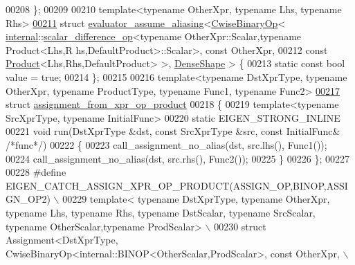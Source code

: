 \begin{DoxyCode}
00208 \};
00209 
00210 \textcolor{keyword}{template}<\textcolor{keyword}{typename} OtherXpr, \textcolor{keyword}{typename} Lhs, \textcolor{keyword}{typename} Rhs>
\hyperlink{struct_eigen_1_1internal_1_1evaluator__assume__aliasing_3_01_cwise_binary_op_3_01internal_1_1sca69efad99c33943cb3731d094798b855b}{00211} \textcolor{keyword}{struct }\hyperlink{struct_eigen_1_1internal_1_1evaluator__assume__aliasing}{evaluator\_assume\_aliasing}<\hyperlink{group___core___module_class_eigen_1_1_cwise_binary_op}{CwiseBinaryOp}<
      \hyperlink{namespaceinternal}{internal}::\hyperlink{struct_eigen_1_1internal_1_1scalar__difference__op}{scalar\_difference\_op}<typename OtherXpr::Scalar,typename Product<Lhs,R
      hs,DefaultProduct>::Scalar>, const OtherXpr,
00212                                                const \hyperlink{group___core___module_class_eigen_1_1_product}{Product}<Lhs,Rhs,DefaultProduct> >, 
      \hyperlink{struct_eigen_1_1_dense_shape}{DenseShape} > \{
00213   \textcolor{keyword}{static} \textcolor{keyword}{const} \textcolor{keywordtype}{bool} value = \textcolor{keyword}{true};
00214 \};
00215 
00216 \textcolor{keyword}{template}<\textcolor{keyword}{typename} DstXprType, \textcolor{keyword}{typename} OtherXpr, \textcolor{keyword}{typename} ProductType, \textcolor{keyword}{typename} Func1, \textcolor{keyword}{typename} Func2>
\hyperlink{struct_eigen_1_1internal_1_1assignment__from__xpr__op__product}{00217} \textcolor{keyword}{struct }\hyperlink{struct_eigen_1_1internal_1_1assignment__from__xpr__op__product}{assignment\_from\_xpr\_op\_product}
00218 \{
00219   \textcolor{keyword}{template}<\textcolor{keyword}{typename} SrcXprType, \textcolor{keyword}{typename} InitialFunc>
00220   \textcolor{keyword}{static} EIGEN\_STRONG\_INLINE
00221   \textcolor{keywordtype}{void} run(DstXprType &dst, \textcolor{keyword}{const} SrcXprType &src, \textcolor{keyword}{const} InitialFunc& \textcolor{comment}{/*func*/})
00222   \{
00223     call\_assignment\_no\_alias(dst, src.lhs(), Func1());
00224     call\_assignment\_no\_alias(dst, src.rhs(), Func2());
00225   \}
00226 \};
00227 
00228 \textcolor{preprocessor}{#define EIGEN\_CATCH\_ASSIGN\_XPR\_OP\_PRODUCT(ASSIGN\_OP,BINOP,ASSIGN\_OP2) \(\backslash\)}
00229 \textcolor{preprocessor}{  template< typename DstXprType, typename OtherXpr, typename Lhs, typename Rhs, typename DstScalar,
       typename SrcScalar, typename OtherScalar,typename ProdScalar> \(\backslash\)}
00230 \textcolor{preprocessor}{  struct Assignment<DstXprType, CwiseBinaryOp<internal::BINOP<OtherScalar,ProdScalar>, const OtherXpr, \(\backslash\)}

\end{DoxyCode}
